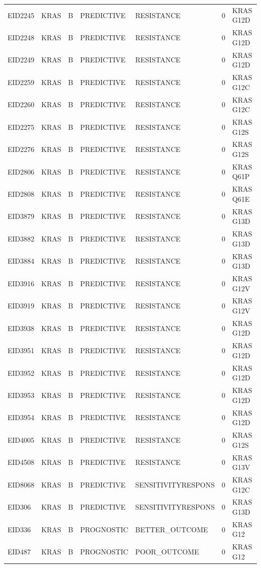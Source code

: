 \begin{footnotesize}
\begin{longtable}{llllllp{4.2cm}}
EID2245 & KRAS & B & PREDICTIVE & RESISTANCE & 0 & KRAS G12D \\
EID2248 & KRAS & B & PREDICTIVE & RESISTANCE & 0 & KRAS G12D \\
EID2249 & KRAS & B & PREDICTIVE & RESISTANCE & 0 & KRAS G12D \\
EID2259 & KRAS & B & PREDICTIVE & RESISTANCE & 0 & KRAS G12C \\
EID2260 & KRAS & B & PREDICTIVE & RESISTANCE & 0 & KRAS G12C \\
EID2275 & KRAS & B & PREDICTIVE & RESISTANCE & 0 & KRAS G12S \\
EID2276 & KRAS & B & PREDICTIVE & RESISTANCE & 0 & KRAS G12S \\
EID2806 & KRAS & B & PREDICTIVE & RESISTANCE & 0 & KRAS Q61P \\
EID2808 & KRAS & B & PREDICTIVE & RESISTANCE & 0 & KRAS Q61E \\
EID3879 & KRAS & B & PREDICTIVE & RESISTANCE & 0 & KRAS G13D \\
EID3882 & KRAS & B & PREDICTIVE & RESISTANCE & 0 & KRAS G13D \\
EID3884 & KRAS & B & PREDICTIVE & RESISTANCE & 0 & KRAS G13D \\
EID3916 & KRAS & B & PREDICTIVE & RESISTANCE & 0 & KRAS G12V \\
EID3919 & KRAS & B & PREDICTIVE & RESISTANCE & 0 & KRAS G12V \\
EID3938 & KRAS & B & PREDICTIVE & RESISTANCE & 0 & KRAS G12D \\
EID3951 & KRAS & B & PREDICTIVE & RESISTANCE & 0 & KRAS G12D \\
EID3952 & KRAS & B & PREDICTIVE & RESISTANCE & 0 & KRAS G12D \\
EID3953 & KRAS & B & PREDICTIVE & RESISTANCE & 0 & KRAS G12D \\
EID3954 & KRAS & B & PREDICTIVE & RESISTANCE & 0 & KRAS G12D \\
EID4005 & KRAS & B & PREDICTIVE & RESISTANCE & 0 & KRAS G12S \\
EID4508 & KRAS & B & PREDICTIVE & RESISTANCE & 0 & KRAS G13V \\
EID8068 & KRAS & B & PREDICTIVE & SENSITIVITYRESPONS & 0 & KRAS G12C \\
EID306 & KRAS & B & PREDICTIVE & SENSITIVITYRESPONS & 0 & KRAS G13D \\
EID336 & KRAS & B & PROGNOSTIC & BETTER\_OUTCOME & 0 & KRAS G12 \\
EID487 & KRAS & B & PROGNOSTIC & POOR\_OUTCOME & 0 & KRAS G12 \\

\end{longtable}
\end{footnotesize}
